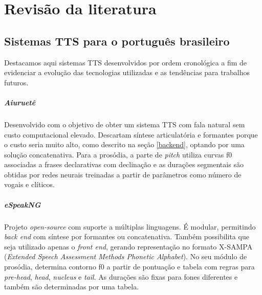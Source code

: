

\chapter{Revisão da literatura}


\section{Sistemas TTS para o português brasileiro}
\label{sistemas}

Destacamos aqui sistemas TTS desenvolvidos por ordem cronológica a fim de
evidenciar a evolução das tecnologias utilizadas e as tendências para trabalhos futuros.
\paragraph{Aiuruetê \cite{aiuruete}}
Desenvolvido com o objetivo de obter um sistema TTS com fala natural sem custo
computacional elevado. Descartam síntese articulatória e formantes porque o
custo seria muito alto, como descrito na seção \ref{backend}, optando por uma
solução concatenativa. Para a prosódia, a parte de \emph{pitch} utiliza curvas
f0 associadas a frases declarativas com declinação e as durações segmentais são
obtidas por redes neurais treinadas a partir de parâmetros como número de vogais e clíticos.

\paragraph{eSpeakNG \cite{espeakng}}
Projeto \emph{open-source} com suporte a múltiplas linguagens. É modular,
permitindo \emph{back end} com síntese por formantes ou concatenativa. Também
possibilita que seja utilizado apenas o \emph{front end}, gerando representação
no formato X-SAMPA (\emph{Extended Speech Assessment Methods Phonetic
  Alphabet}). No seu módulo de prosódia, determina contorno f0 a partir de
pontuação e tabela com regras para \emph{pre-head}, \emph{head}, \emph{nucleus}
e \emph{tail}. As durações são fixas para fones diferentes e também são
determinadas por uma tabela.

